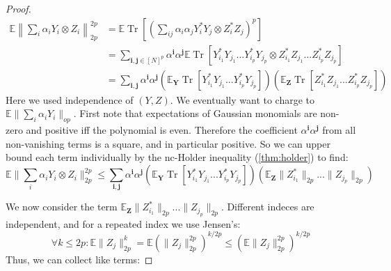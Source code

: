 \documentclass{article}
\newtheorem{claim}[theorem]{Claim}
\renewcommand{\vec}{\bm}
\newcommand{\E}{\mathbb{E}}
\newcommand\tr{\operatorname{Tr}}
\begin{document}
\begin{proof}
\begin{align*} \E \left\|\sum_{i} \alpha_{i} Y_{i} \otimes Z_{i}\right\|_{2p}^{2p} & = \E \tr \left[ \left( \sum_{ij} \alpha_{i} \alpha_{j} Y_{i}^{*} Y_{j} \otimes Z_{i}^{*} Z_{j} \right)^{p} \right]  \\
& = \sum_{\vec{i},\vec{j} \in [N]^{p}} \alpha^{\vec{i}} \alpha^{\vec{j}} \E \tr [ Y_{i_{1}}^{*} Y_{j_{1}} ... Y_{i_{p}}^{*} Y_{j_{p}} \otimes Z_{i_{1}}^{*} Z_{j_{1}} ... Z_{i_{p}}^{*} Z_{j_{p}}  ]   \\
& = \sum_{\vec{i},\vec{j}} \alpha^{\vec{i}} \alpha^{\vec{j}} (\E_{\vec Y} \tr [ Y_{i_{1}}^{*} Y_{j_{1}} ... Y_{i_{p}}^{*} Y_{j_{p}} ] ) (\E_{\vec Z} \tr [ Z_{i_{1}}^{*} Z_{j_{1}} ... Z_{i_{p}}^{*} Z_{j_{p}} ] )  
\end{align*}
Here we used independence of $(Y,Z)$. We eventually want to charge to $\E \|\sum_{i} \alpha_{i} Y_{i}\|_{op}$. First note that expectations of Gaussian monomials are non-zero and positive iff the polynomial is even. Therefore the coefficient $\alpha^{\vec{i}} \alpha^{\vec{j}}$ from all non-vanishing terms is a square, and in particular positive. So we can upper bound each term individually by the nc-Holder inequality (\cref{thm:holder}) to find: 
\[\E \|\sum_{i} \alpha_{i} Y_{i} \otimes Z_{i}\|_{2p}^{2p} \leq \sum_{\vec{i},\vec{j}} \alpha^{\vec{i}} \alpha^{\vec{j}} (\E_{\vec Y} \tr [ Y_{i_{1}}^{*} Y_{j_{1}} ... Y_{i_{p}}^{*} Y_{j_{p}} ] ) ( \E_{\vec Z} \|Z_{i_{1}}^{*}\|_{2p} ... \|Z_{j_{p}}\|_{2p} )  \]

We now consider the term $\E_{\vec Z} \|Z_{i_{1}}^{*}\|_{2p} ... \|Z_{j_{p}}\|_{2p}$. Different indeces are independent, and for a repeated index we use Jensen's: 
\[ \forall k \leq 2p: \E \|Z_j\|_{2p}^{k} = \E (\|Z_j\|_{2p}^{2p})^{k/{2p}} \leq  ( \E \|Z_j\|_{2p}^{2p} )^{k/2p}  \] 
Thus, we can collect like terms:



\end{proof}
\end{document}
